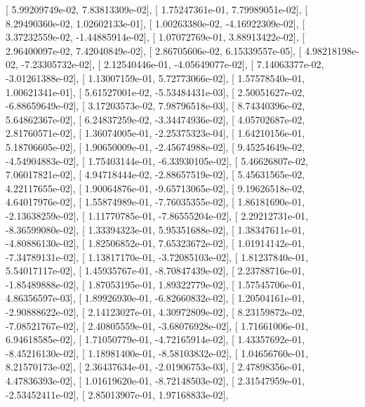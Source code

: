\documentclass{article}
\begin{document}
       [  5.99209749e-02,   7.83813309e-02],
       [  1.75247361e-01,   7.79989051e-02],
       [  8.29490360e-02,   1.02602133e-01],
       [  1.00263380e-02,  -4.16922309e-02],
       [  3.37232559e-02,  -1.44885914e-02],
       [  1.07072769e-01,   3.88913422e-02],
       [  2.96400097e-02,   7.42040849e-02],
       [  2.86705606e-02,   6.15339557e-05],
       [  4.98218198e-02,  -7.23305732e-02],
       [  2.12540446e-01,  -4.05649077e-02],
       [  7.14063377e-02,  -3.01261388e-02],
       [  1.13007159e-01,   5.72773066e-02],
       [  1.57578540e-01,   1.00621341e-01],
       [  5.61527001e-02,  -5.53484431e-03],
       [  2.50051627e-02,  -6.88659649e-02],
       [  3.17203573e-02,   7.98796518e-03],
       [  8.74340396e-02,   5.64862367e-02],
       [  6.24837259e-02,  -3.34474936e-02],
       [  4.05702687e-02,   2.81760571e-02],
       [  1.36074005e-01,  -2.25375323e-04],
       [  1.64210156e-01,   5.18706605e-02],
       [  1.90650009e-01,  -2.45674988e-02],
       [  9.45254649e-02,  -4.54904883e-02],
       [  1.75403144e-01,  -6.33930105e-02],
       [  5.46626807e-02,   7.06017821e-02],
       [  4.94718444e-02,  -2.88657519e-02],
       [  5.45631565e-02,   4.22117655e-02],
       [  1.90064876e-01,  -9.65713065e-02],
       [  9.19626518e-02,   4.64017976e-02],
       [  1.55874989e-01,  -7.76035355e-02],
       [  1.86181690e-01,  -2.13638259e-02],
       [  1.11770785e-01,  -7.86555204e-02],
       [  2.29212731e-01,  -8.36599080e-02],
       [  1.33394323e-01,   5.95351688e-02],
       [  1.38347611e-01,  -4.80886130e-02],
       [  1.82506852e-01,   7.65323672e-02],
       [  1.01914142e-01,  -7.34789131e-02],
       [  1.13817170e-01,  -3.72085103e-02],
       [  1.81237840e-01,   5.54017117e-02],
       [  1.45935767e-01,  -8.70847439e-02],
       [  2.23788716e-01,  -1.85489888e-02],
       [  1.87053195e-01,   1.89322779e-02],
       [  1.57545706e-01,   4.86356597e-03],
       [  1.89926930e-01,  -6.82660832e-02],
       [  1.20504161e-01,  -2.90888622e-02],
       [  2.14123027e-01,   4.30972809e-02],
       [  8.23159872e-02,  -7.08521767e-02],
       [  2.40805559e-01,  -3.68076928e-02],
       [  1.71661006e-01,   6.94618585e-02],
       [  1.71050779e-01,  -4.72165914e-02],
       [  1.43357692e-01,  -8.45216130e-02],
       [  1.18981400e-01,  -8.58103832e-02],
       [  1.04656760e-01,   8.21570173e-02],
       [  2.36437634e-01,  -2.01906753e-03],
       [  2.47898356e-01,   4.47836393e-02],
       [  1.01619620e-01,  -8.72148503e-02],
       [  2.31547959e-01,  -2.53452411e-02],
       [  2.85013907e-01,   1.97168833e-02],
\end{document}

